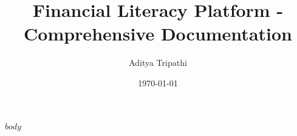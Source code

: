 \documentclass[11pt,a4paper]{article}
\begin{document}
\title{\textbf{Financial Literacy Platform - Comprehensive Documentation}}
\author{Aditya Tripathi}
\date{\today}
\maketitle

\tableofcontents
\newpage

$body$
\end{document}
